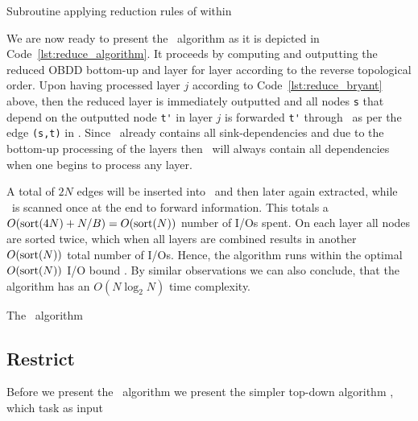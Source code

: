 \begin{lstfloat}[ht!]
  \centering

  

  \caption{Subroutine applying reduction rules of \cite{Bryant86} within \Reduce}
  \label{lst:reduce_bryant}
\end{lstfloat}

We are now ready to present the \Reduce\ algorithm as it is depicted in
Code~\ref{lst:reduce_algorithm}. It proceeds by computing and outputting the
reduced OBDD bottom-up and layer for layer according to the reverse topological
order. Upon having processed layer $j$ according to Code~\ref{lst:reduce_bryant}
above, then the reduced layer is immediately outputted and all nodes
\lstinline{s} that depend on the outputted node \lstinline{t'} in layer $j$ is
forwarded \lstinline{t'} through \ReduceQdep\ as per the edge \lstinline{(s,t)}
in \ReduceLforward. Since \ReduceQdep\ already contains all sink-dependencies
and due to the bottom-up processing of the layers then \ReduceQdep\ will always
contain all dependencies when one begins to process any layer.

A total of $2 N$ edges will be inserted into \ReduceQdep\ and then later again
extracted, while \ReduceLforward\ is scanned once at the end to forward
information. This totals a $O(\text{sort}(4N) + N/B) = O(\text{sort}(N))$ number of I/Os
spent. On each layer all nodes are sorted twice, which when all layers are
combined results in another $O(\text{sort}(N))$ total number of I/Os. Hence, the
algorithm runs within the optimal $O(\text{sort}(N))$ I/O bound \cite{Arge96}. By
similar observations we can also conclude, that the algorithm has an $O(N \log_2
N)$ time complexity.

\begin{lstfloat}
  \centering

  

  \caption{The \Reduce\ algorithm}
  \label{lst:reduce_algorithm}
\end{lstfloat}

\clearpage
\subsection{Restrict} \label{sec:theory__restrict}
Before we present the \Apply\ algorithm we present the simpler top-down
algorithm \Restrict, which task as input


